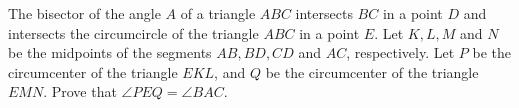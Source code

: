 The bisector of the angle $A$ of a triangle $ABC$ intersects $BC$ in a point $D$ and intersects the circumcircle of the triangle $ABC$ in a point $E$. Let $K,L,M$ and $N$ be the midpoints of the segments $AB,BD,CD$ and $AC$,  respectively. Let $P$  be the circumcenter of the triangle $EKL$,  and $Q$ be the circumcenter of the triangle $EMN$. Prove that $\angle PEQ=\angle BAC$.